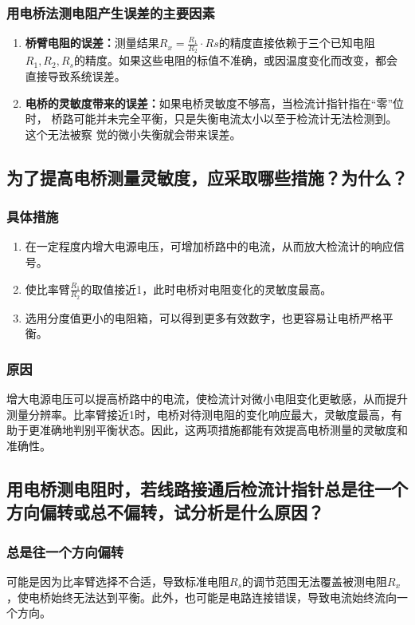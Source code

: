\documentclass[]{../template/Report}%
\begin{document}
\begin{fullreportonly}
\subsubsection{用电桥法测电阻产生误差的主要因素}
\begin{enumerate}
    \item \textbf{桥臂电阻的误差：}测量结果$ R_x = \frac{R_1}{R_2} \cdot Rs $的精度直接依赖于三个已知电阻$R_1, R_2, R_s$的精度。如果这些电阻的标值不准确，或因温度变化而改变，都会直接导致系统误差。
    \item \textbf{电桥的灵敏度带来的误差：}如果电桥灵敏度不够高，当检流计指针指在“零”位时，
        桥路可能并未完全平衡，只是失衡电流太小以至于检流计无法检测到。这个无法被察
        觉的微小失衡就会带来误差。
\end{enumerate}

\subsection{为了提高电桥测量灵敏度，应采取哪些措施？为什么？}
\subsubsection{具体措施}
\begin{enumerate}
    \item 在一定程度内增大电源电压，可增加桥路中的电流，从而放大检流计的响应信号。
    \item 使比率臂$\frac{R_1}{R_2}$的取值接近1，此时电桥对电阻变化的灵敏度最高。
    \item 选用分度值更小的电阻箱，可以得到更多有效数字，也更容易让电桥严格平衡。
\end{enumerate}
\subsubsection{原因}
增大电源电压可以提高桥路中的电流，使检流计对微小电阻变化更敏感，从而提升测量分辨率。比率臂接近1时，电桥对待测电阻的变化响应最大，灵敏度最高，有助于更准确地判别平衡状态。因此，这两项措施都能有效提高电桥测量的灵敏度和准确性。

\subsection{用电桥测电阻时，若线路接通后检流计指针总是往一个方向偏转或总不偏转，试分析是什么原因？}
\subsubsection{总是往一个方向偏转}
可能是因为比率臂选择不合适，导致标准电阻$R_s$的调节范围无法覆盖被测电阻$R_x$，使电桥始终无法达到平衡。此外，也可能是电路连接错误，导致电流始终流向一个方向。

\end{fullreportonly}
\end{document}
